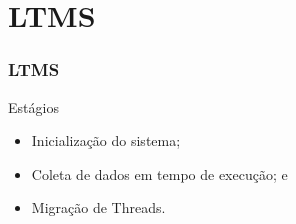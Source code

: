 \documentclass[10pt, pdf,xcolor=pdftex,dvipsnames,table]{beamer}
\begin{document}


\section{LTMS}
\begin{frame} \frametitle{LTMS}
    \begin{block}{Estágios}
        \begin{itemize}
        	\item Inicialização do sistema;
        	\item Coleta de dados em tempo de execução; e
        	\item Migração de Threads.
        \end{itemize}
    \end{block}
\end{frame}
\end{document}
